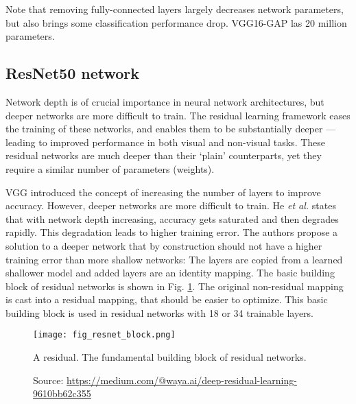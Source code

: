 Note that removing fully-connected layers largely decreases network parameters, but also brings some classification performance drop. VGG16-GAP las 20 million parameters.


\subsection{ResNet50 network}
Network depth is of crucial importance in neural network architectures, but deeper networks are more difficult to train. The residual learning framework eases the training of these networks, and enables them to be substantially deeper — leading to improved performance in both visual and non-visual tasks. These residual networks are much deeper than their ‘plain’ counterparts, yet they require a similar number of parameters (weights).

VGG introduced the concept of increasing the number of layers to improve accuracy. However, deeper networks are more difficult to train. He \textit{et al.} \cite{he2016deep} states that with network depth increasing, accuracy gets saturated and then degrades rapidly. This degradation leads to higher training error. The authors propose a solution to a deeper network that by construction should not have a higher training error than more shallow networks: The layers are copied from a learned shallower model and added layers are an identity mapping. The basic building block of residual networks is shown in Fig. \ref{fig:resnet_block}. The original non-residual mapping is cast into a residual mapping, that should be easier to optimize. This basic building block is used in residual networks with 18 or 34 trainable layers. 
\begin{figure}[ht]
    \begin{center}       
    \texttt{[image: fig\_resnet\_block.png]}
    \caption[Residual block]{A residual. The fundamental building block of residual networks.}
    \caption*{Source: \href{https://medium.com/@waya.ai/deep-residual-learning-9610bb62c355}{https://medium.com/@waya.ai/deep-residual-learning-9610bb62c355}}
    \label{fig:resnet_block}
    \end{center}
\end{figure}

